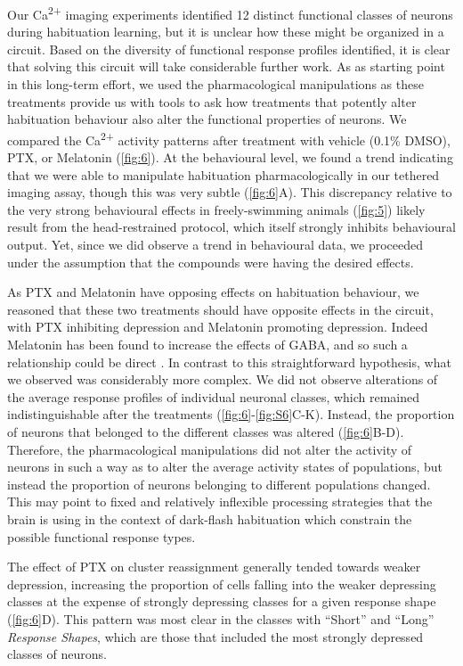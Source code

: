 \documentclass[9pt,lineno]{RandlettLab_elife}
\begin{document}
Our Ca\textsuperscript{2+} imaging experiments identified 12 distinct functional classes of neurons during habituation learning, but it is unclear how these might be organized in a circuit. Based on the diversity of functional response profiles identified, it is clear that solving this circuit will take considerable further work. As as starting point in this long-term effort, we used  the pharmacological manipulations as these treatments provide us with tools to ask how treatments that potently alter habituation behaviour also alter the functional properties of neurons.  We compared the Ca\textsuperscript{2+} activity patterns after treatment with vehicle (0.1\% DMSO), PTX, or Melatonin (\autoref{fig:6}). At the behavioural level, we found a trend indicating that we were able to manipulate habituation pharmacologically in our tethered imaging assay, though this was very subtle (\autoref{fig:6}A). This discrepancy relative to the very strong behavioural effects in freely-swimming animals (\autoref{fig:5}) likely result from the head-restrained protocol, which itself strongly inhibits behavioural output. Yet, since we did observe a trend in behavioural data, we proceeded under the assumption that the compounds were having the desired effects.

As PTX and Melatonin have opposing effects on habituation behaviour, we reasoned that these two treatments should have opposite effects in the circuit, with PTX inhibiting depression and Melatonin promoting depression. Indeed Melatonin has been found to increase the effects of GABA, and so such a relationship could be direct \citep{Cheng2012-gv, Niles1987-oc}. In contrast to this straightforward hypothesis, what we observed was considerably more complex. We did not observe alterations of the average response profiles of individual neuronal classes, which remained indistinguishable after the treatments (\autoref{fig:6}-\autoref{fig:S6}C-K). Instead, the proportion of neurons that belonged to the different classes was altered (\autoref{fig:6}B-D). Therefore, the pharmacological manipulations did not alter the activity of neurons in such a way as to alter the average activity states of populations, but instead the proportion of neurons belonging to different populations changed. This may point to fixed and relatively inflexible processing strategies that the brain is using in the context of dark-flash habituation which constrain the possible functional response types. 

The effect of PTX on cluster reassignment generally tended towards weaker depression, increasing the proportion of cells falling into the weaker depressing classes at the expense of strongly depressing classes for a given response shape (\autoref{fig:6}D). This pattern was most clear in the classes with “Short” and “Long” \emph{Response Shapes}, which are those that included the most strongly depressed classes of neurons.
\end{document}
